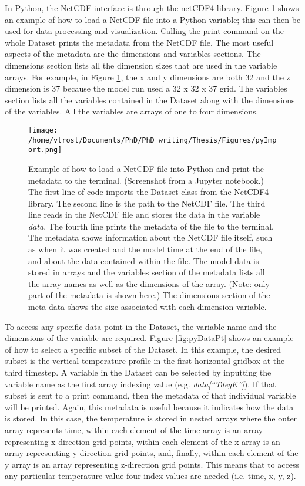 In Python, the NetCDF interface is through the netCDF4 library. Figure \ref{fig:pyImport} shows an example of how to load a NetCDF file into a Python variable; this can then be used for data processing and visualization. Calling the print command on the whole Dataset prints the metadata from the NetCDF file. The most useful aspects of the metadata are the dimensions and variables sections. The dimensions section lists all the dimension sizes that are used in the variable arrays. For example, in Figure \ref{fig:pyImport}, the x and y dimensions are both 32 and the z dimension is 37 because the model run used a 32 x 32 x 37 grid. The variables section lists all the variables contained in the Dataset along with the dimensions of the variables. All the variables are arrays of one to four dimensions. \citep{moncCode}

\begin{figure}[H]
	\centering
	\texttt{[image: /home/vtrost/Documents/PhD/PhD\_writing/Thesis/Figures/pyImport.png]}
	\caption{Example of how to load a NetCDF file into Python and print the metadata to the terminal. (Screenshot from a Jupyter notebook.) The first line of code imports the Dataset class from the NetCDF4 library. The second line is the path to the NetCDF file. The third line reads in the NetCDF file and stores the data in the variable \textit{data}. The fourth line prints the metadata of the file to the terminal. The metadata shows information about the NetCDF file itself, such as when it was created and the model time at the end of the file, and about the data contained within the file. The model data is stored in arrays and the variables section of the metadata lists all the array names as well as the dimensions of the array. (Note: only part of the metadata is shown here.) The dimensions section of the meta data shows the size associated with each dimension variable.}
	\label{fig:pyImport}
\end{figure}

To access any specific data point in the Dataset, the variable name and the dimensions of the variable are required. Figure \ref{fig:pyDataPt} shows an example of how to select a specific subset of the Dataset. In this example, the desired subset is the vertical temperature profile in the first horizontal gridbox at the third timestep. A variable in the Dataset can be selected by inputting the variable name as the first array indexing value (e.g. \textit{data[``TdegK'']}). If that subset is sent to a print command, then the metadata of that individual variable will be printed. Again, this metadata is useful because it indicates how the data is stored. In this case, the temperature is stored in nested arrays where the outer array represents time, within each element of the time array is an array representing x-direction grid points, within each element of the x array is an array representing y-direction grid points, and, finally, within each element of the y array is an array representing z-direction grid points. This means that to access any particular temperature value four index values are needed (i.e. time, x, y, z).

